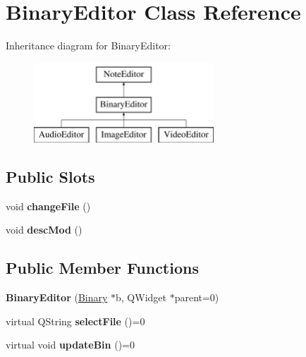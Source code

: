 \hypertarget{classBinaryEditor}{\section{\-Binary\-Editor \-Class \-Reference}
\label{classBinaryEditor}
}
\-Inheritance diagram for \-Binary\-Editor\-:\begin{figure}[H]
\begin{center}
\leavevmode
\includegraphics[height=3.000000cm]{classBinaryEditor}
\end{center}
\end{figure}
\subsection*{\-Public \-Slots}
\begin{DoxyCompactItemize}
\item 
\hypertarget{classBinaryEditor_a2d70480e4b7b1f4e6db2d7ff3f5d09c2}{void {\bfseries change\-File} ()}\label{classBinaryEditor_a2d70480e4b7b1f4e6db2d7ff3f5d09c2}

\item 
\hypertarget{classBinaryEditor_add18586342bbdc59cfadf4333e67d3e4}{void {\bfseries desc\-Mod} ()}\label{classBinaryEditor_add18586342bbdc59cfadf4333e67d3e4}

\end{DoxyCompactItemize}
\subsection*{\-Public \-Member \-Functions}
\begin{DoxyCompactItemize}
\item 
\hypertarget{classBinaryEditor_ab417e9c2a932d10cfdfa98db1493c0cf}{{\bfseries \-Binary\-Editor} (\hyperlink{classBinary}{\-Binary} $\ast$b, \-Q\-Widget $\ast$parent=0)}\label{classBinaryEditor_ab417e9c2a932d10cfdfa98db1493c0cf}

\item 
\hypertarget{classBinaryEditor_a48623d75859581b4f981a4e33cae314b}{virtual \-Q\-String {\bfseries select\-File} ()=0}\label{classBinaryEditor_a48623d75859581b4f981a4e33cae314b}

\item 
\hypertarget{classBinaryEditor_a14e70913a4e914b02029ae9fd737fcce}{virtual void {\bfseries update\-Bin} ()=0}\label{classBinaryEditor_a14e70913a4e914b02029ae9fd737fcce}

\end{DoxyCompactItemize}
